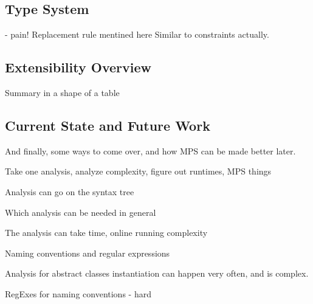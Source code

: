 \subsection{Type System}
- pain! Replacement rule mentined here
Similar to constraints actually.


\subsection{Extensibility Overview}
Summary in a shape of a table


\subsection{Current State and Future Work}
And finally, some ways to come over, and how MPS can be made better later.



Take one analysis, analyze complexity, figure out runtimes, MPS things

 Analysis can go on the syntax tree

 Which analysis can be needed in general
 
 The analysis can take time, online running complexity
 
 Naming conventions and regular expressions


 Analysis for abstract classes instantiation can happen very often, and is complex.
 
 
 
 RegExes for naming conventions - hard